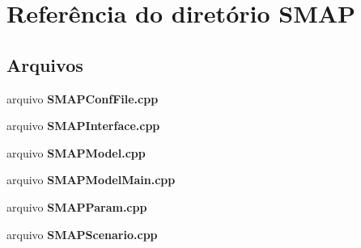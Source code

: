 \section{Referência do diretório S\+M\+AP}
\label{dir_ba2f43f0c1e16b81c833d9360c085c5d}
\subsection*{Arquivos}
\begin{DoxyCompactItemize}
\item 
arquivo {\bf S\+M\+A\+P\+Conf\+File.\+cpp}
\item 
arquivo {\bf S\+M\+A\+P\+Interface.\+cpp}
\item 
arquivo {\bf S\+M\+A\+P\+Model.\+cpp}
\item 
arquivo {\bf S\+M\+A\+P\+Model\+Main.\+cpp}
\item 
arquivo {\bf S\+M\+A\+P\+Param.\+cpp}
\item 
arquivo {\bf S\+M\+A\+P\+Scenario.\+cpp}
\end{DoxyCompactItemize}

